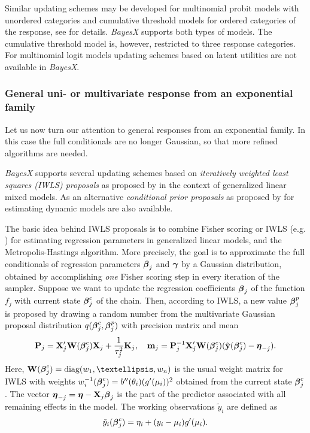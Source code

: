 \documentclass[11pt,a4paper,twoside]{bayesxarticle}
\begin{document}
Similar updating schemes may be developed for multinomial probit models with unordered categories and cumulative threshold
models for ordered categories of the response, see  for details. {\em BayesX} supports both types of
models. The cumulative threshold model is, however, restricted to three response categories. For multinomial logit models
updating schemes based on latent utilities are not available in {\em BayesX}.

\subsubsection{General uni- or multivariate response from an exponential family}
\label{IWLS} 

Let us now turn our attention to general responses from an
exponential family. In this case the full conditionals are no longer
Gaussian, so that more refined algorithms are needed.

{\em BayesX} supports several updating schemes based on {\em iteratively weighted least squares (IWLS) proposals} as proposed
by  in the context of generalized linear mixed models. As an alternative {\em conditional prior proposals} as
proposed by  for estimating dynamic models are also available.

The basic idea behind IWLS proposals is to combine Fisher scoring or IWLS (e.g. ) for estimating
regression parameters in generalized linear models, and the Metropolis-Hastings algorithm. More precisely, the goal is to
approximate the full conditionals of regression parameters $\boldsymbol{\beta}_j$ and $\boldsymbol{\gamma}$ by a Gaussian distribution, obtained by
accomplishing {\em one} Fisher scoring step in every iteration of the sampler. Suppose we want to update the regression
coefficients $\boldsymbol{\beta}_j$ of the  function $f_j$ with current state $\boldsymbol{\beta}_j^c$ of the chain. Then, according to IWLS, a new
value $\boldsymbol{\beta}_j^p$ is proposed by drawing a random number from the multivariate Gaussian proposal distribution
$q(\boldsymbol{\beta}_j^c,\boldsymbol{\beta}_j^p)$ with precision matrix and mean
\begin{equation}
\label{prec} \Pvec_j = \Xvec_j'\Wvec(\betavec^c_j)\Xvec_j + \frac{1}{\tau^2_j} \Kvec_j,
\quad \mvec_j = \Pvec_j^{-1}\Xvec_j'\Wvec(\betavec^c_j)(\tilde{\yvec}(\betavec^c_j) -
\etavec_{-j}).
\end{equation}
Here, $\Wvec(\betavec^c_j) = \diag(w_1,\dots,w_n)$ is the usual weight
matrix for IWLS with weights $w^{-1}_i(\boldsymbol{\beta}^c_j) =
b''(\theta_i)(g'(\mu_i))^2$ obtained from the current state
$\boldsymbol{\beta}^c_j$. The vector $\boldsymbol{\eta}_{-j}=\boldsymbol{\eta}-\mathbf{X}_j\boldsymbol{\beta}_j$ is the part of
the predictor associated with all remaining effects in the model.
The working observations $\tilde{y}_i$ are defined as
$$\tilde{y}_i(\boldsymbol{\beta}^c_j) = \eta_i + (y_i - \mu_i)g'(\mu_i).$$
\end{document}
